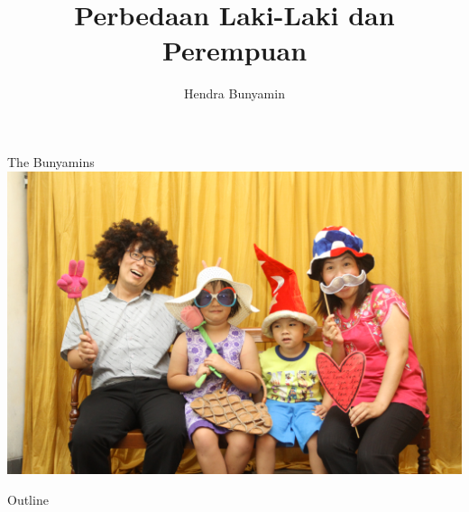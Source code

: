 \documentclass{beamer}
\title[Perbedaan Laki-Laki dan Perempuan] %
{\textbf{Perbedaan Laki-Laki dan Perempuan}\\ \citep{susabda2021konseling}}
\author[Hendra Bunyamin] %
{Hendra Bunyamin}
\institute[ ] %
{
  \hfill \break
  \hfill \break
  \hfill \break
  \large
  Bimbingan Pranikah\\
  GKI Anugerah
}
\theoremstyle{mystyle}
\begin{document}
\begin{frame}
  \titlepage
\end{frame}

\begin{frame}{The Bunyamins}
	\centering
	\includegraphics[scale=.125]{family-gullit}
\end{frame}

\begin{frame}{Outline}
  \tableofcontents
\end{frame}





\end{document}
